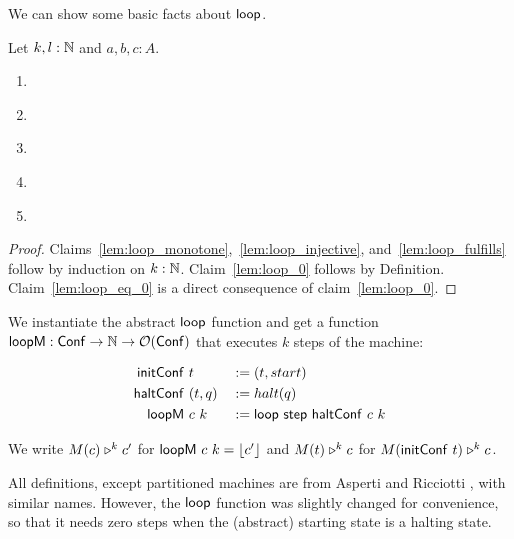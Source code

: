 We can show some basic facts about $\mathsf{loop}$.
\begin{lemma}
  \label{lem:loop}
  Let $k,l : \mathbb{N}$ and $a,b,c:A$.
  \begin{enumerate}
  \item \label{lem:loop_monotone}
  \item \label{lem:loop_injective}
  \item \label{lem:loop_fulfills}
  \item \label{lem:loop_0}
  \item \label{lem:loop_eq_0}
  \end{enumerate}
\end{lemma}
\begin{proof}
  Claims~\ref{lem:loop_monotone},~\ref{lem:loop_injective}, and~\ref{lem:loop_fulfills} follow by induction on $k : \mathbb{N}$.  Claim~\ref{lem:loop_0}
  follows by Definition.  Claim~\ref{lem:loop_eq_0} is a direct consequence of claim~\ref{lem:loop_0}.
\end{proof}


We instantiate the abstract $\mathsf{loop}$ function and get a function $\mathsf{loopM} : \mathsf{Conf} \rightarrow \mathbb{N} \rightarrow \mathcal{O}(\mathsf{Conf})$ that executes $k$ steps of the
machine:
\begin{definition}
  \begin{alignat*}{3}
    \mathsf{initConf}   &~t         &&:= (t, start) \\
    \mathsf{haltConf}   &~(t, q)    &&:= halt(q) \\
    \mathsf{loopM}      &~c~k       &&:= \mathsf{loop}~\mathsf{step}~\mathsf{haltConf}~c~k
  \end{alignat*}
\end{definition}

We write $M(c) \mathrel{\triangleright}^k c'$ for $\mathsf{loopM}~c~k = \left\lfloor {c'} \right\rfloor$ and $M(t) \mathrel{\triangleright}^k c$ for $M(\mathsf{initConf}~t) \mathrel{\triangleright}^k c$.

All definitions, except partitioned machines are from Asperti and Ricciotti \cite{asperti2015}, with similar names.  However, the $\mathsf{loop}$ function
was slightly changed for convenience, so that it needs zero steps when the (abstract) starting state is a halting state.

